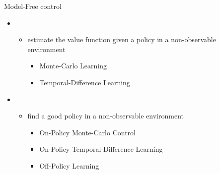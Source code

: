 \bgroup
\begin{frame}{Model-Free control}
\begin{itemize}
\item {}
\begin{itemize}
\item estimate the value function given a policy in a non-observable environment
\begin{itemize}
\item Monte-Carlo Learning
\item Temporal-Difference Learning
\end{itemize}
\end{itemize}
\item {}
\begin{itemize}
\item find a good policy in a non-observable environment
\begin{itemize}
\item On-Policy Monte-Carlo Control
\item On-Policy Temporal-Difference Learning
\item Off-Policy Learning
\end{itemize}
\end{itemize}
\end{itemize}
\end{frame}
\egroup